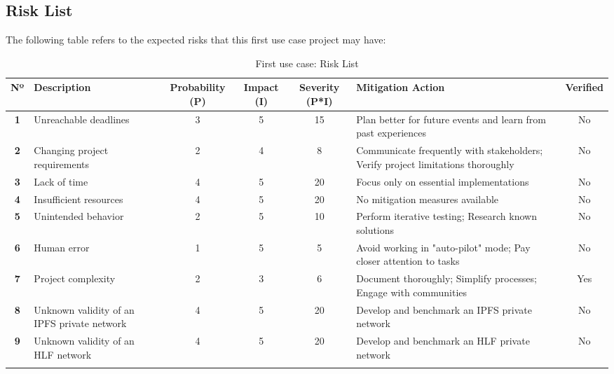 \subsection{Risk List}
The following table refers to the expected risks that this first use case project may have:

\renewcommand{\arraystretch}{1.5} %
\begin{longtable}{|c|p{2cm}|c|c|c|p{2cm}|c|} 
	
	\hline
	\textbf{Nº} & 
	\textbf{Description} & 
	\textbf{Probability (P)} & 
	\textbf{Impact (I)} & 
	\textbf{Severity (P*I)} & 
	\textbf{Mitigation Action} & 
	\textbf{Verified}  
	\\ \hline
	\endfirsthead
	
	\hline
	\textbf{1} 
	& 
	Unreachable deadlines
	& 3 
	& 5 
	& 15 
	& Plan better for future events and learn from past experiences
	& No
	\\ \hline
	
	\textbf{2} 
	& 
	Changing project requirements
	& 2 
	& 4 
	& 8 
	& Communicate frequently with stakeholders; Verify project limitations thoroughly
	& No
	\\ \hline
	
	\textbf{3} 
	& 
	Lack of time
	& 4 
	& 5 
	& 20 
	& Focus only on essential implementations
	& No
	\\ \hline
	
	\textbf{4} 
	& 
	Insufficient resources
	& 4 
	& 5 
	& 20 
	& No mitigation measures available
	& No
	\\ \hline
	
	\textbf{5} 
	& 
	Unintended behavior
	& 2 
	& 5 
	& 10 
	& Perform iterative testing; Research known solutions
	& No
	\\ \hline
	
	\textbf{6} 
	& 
	Human error
	& 1 
	& 5 
	& 5 
	& Avoid working in "auto-pilot" mode; Pay closer attention to tasks
	& No
	\\ \hline
	
	\textbf{7} 
	& 
	Project complexity
	& 2 
	& 3 
	& 6 
	& Document thoroughly; Simplify processes; Engage with communities
	& Yes
	\\ \hline
	
	\textbf{8} 
	& 
	Unknown validity of an IPFS private network
	& 4 
	& 5 
	& 20 
	& Develop and benchmark an IPFS private network
	& No
	\\ \hline
	
	\textbf{9}
	& 
	Unknown validity of an HLF network
	& 4 
	& 5 
	& 20 
	& Develop and benchmark an HLF private network
	& No
	\\ \hline
	
	\caption{First use case: Risk List} \label{tab:activity_schedule} 
	
\end{longtable}

